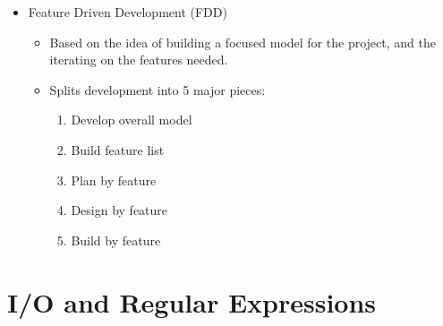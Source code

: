 \documentclass[11pt]{article}
\begin{document}
\begin{itemize}
		\item Feature Driven Development (FDD)
			\begin{itemize}
				\item Based on the idea of building a focused model for the project, and the iterating on the features needed.
				\item Splits development into 5 major pieces:
					\begin{enumerate}
						\item Develop overall model
						\item Build feature list
						\item Plan by feature
						\item Design by feature
						\item Build by feature
					\end{enumerate}
			\end{itemize}

	\end{itemize}

\newpage

\section*{I/O and Regular Expressions}
\end{document}
